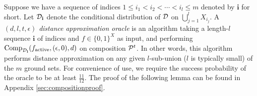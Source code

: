 
Suppose we have a sequence of indices $1\leq i_1<i_2<\cdots<i_l\leq m$ denoted by $\mathbf i$ for short. Let ${\mathcal{D}}_{\mathbf i}$ denote the conditional distribution of ${\mathcal{D}}$ on $\bigcup\limits_{j=1}^lX_{i_j}$. A \emph{$(d,l,t,\epsilon)$ distance approximation oracle} is an algorithm taking a length-$l$ sequence $\mathbf i$ of indices and $f\in\{0,1\}^X$ as input, and performing ${\mathrm{Comp}}_{{\mathcal{D}}_{\mathbf i}}(f_{\mathrm{active}},(\epsilon,0),d)$ on composition ${\mathcal{P}}^t$. In other words, this algorithm performs distance approximation on any given $l$-sub-union ($l$ is typically small) of the $m$ ground sets. For convenience of use, we require the success probability of the oracle to be at least $\frac{11}{12}$. The proof of the following lemma can be found in Appendix \ref{sec:compositionproof}.






